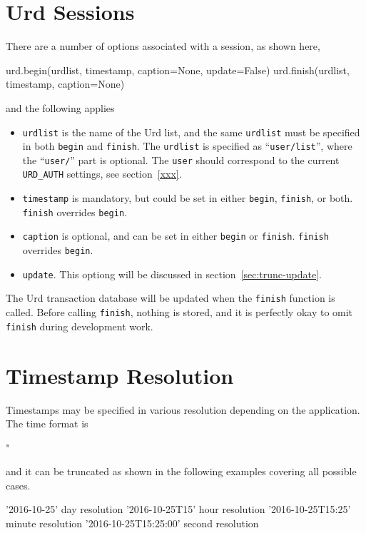 \section{Urd Sessions}

There are a number of options associated with a session, as shown
here,
\begin{python}
urd.begin(urdlist, timestamp, caption=None, update=False)
urd.finish(urdlist, timestamp, caption=None)
\end{python}
and the following applies
\begin{itemize}
\item [] \texttt{urdlist} is the name of the Urd list, and the same
  \texttt{urdlist} must be specified in both \texttt{begin}
  and \texttt{finish}.  The \texttt{urdlist} is specified as
  ``\texttt{user/list}'', where the ``\texttt{user/}'' part is
  optional.  The \texttt{user} should correspond to the
  current \texttt{URD\_AUTH} settings, see section~\ref{xxx}.

\item [] \texttt{timestamp} is mandatory, but could be set in either
  \texttt{begin}, \texttt{finish}, or both.  \texttt{finish}
  overrides \texttt{begin}.

\item [] \texttt{caption} is optional, and can be set in either
  \texttt{begin} or \texttt{finish}.  \texttt{finish} overrides
  \texttt{begin}.

\item [] \texttt{update}.  This optiong will be discussed in
section~\ref{sec:trunc-update}.
\end{itemize}

The Urd transaction database will be updated when the \texttt{finish}
function is called.  Before calling \texttt{finish}, nothing is
stored, and it is perfectly okay to omit \texttt{finish} during
development work.




\section{Timestamp Resolution}

Timestamps may be specified in various resolution depending on the
application.  The time format is
\begin{python}
"%
\end{python}
and it can be truncated as shown in the following examples covering
all possible cases.
\begin{python}
'2016-10-25'               day resolution
'2016-10-25T15'            hour resolution
'2016-10-25T15:25'         minute resolution
'2016-10-25T15:25:00'      second resolution
\end{python}



